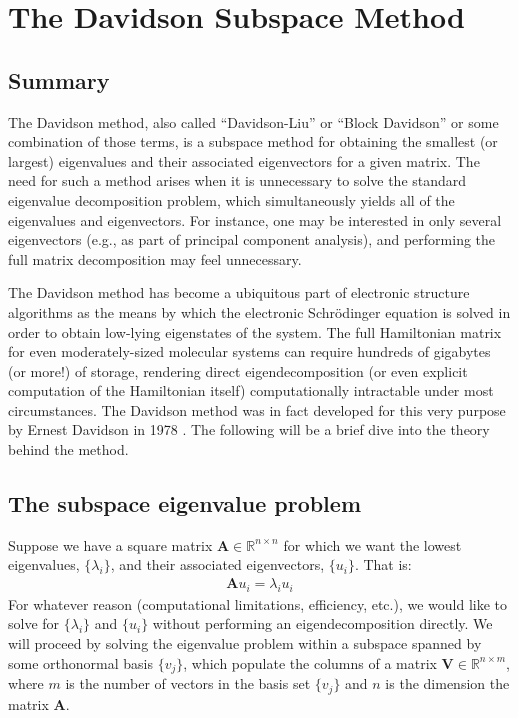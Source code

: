 \documentclass[12pt, fleqn]{article}
\begin{document}
\section*{The Davidson Subspace Method}
\subsection*{Summary}
\label{subsec:Summary}
The Davidson method, also called ``Davidson-Liu'' or ``Block Davidson'' or some combination of those terms, is a subspace method for obtaining the smallest (or largest) eigenvalues and their associated eigenvectors for a given matrix.
The need for such a method arises when it is unnecessary to solve the standard eigenvalue decomposition problem, which simultaneously yields all of the eigenvalues and eigenvectors. 
For instance, one may be interested in only several eigenvectors (e.g., as part of principal component analysis), and performing the full matrix decomposition may feel unnecessary. \newline

\noindent The Davidson method has become a ubiquitous part of electronic structure algorithms as the means by which the electronic Schr\"odinger equation is solved in order to obtain low-lying eigenstates of the system. 
The full Hamiltonian matrix for even moderately-sized molecular systems can require hundreds of gigabytes (or more!) of storage, rendering direct eigendecomposition (or even explicit computation of the Hamiltonian itself) computationally intractable under most circumstances.
The Davidson method was in fact developed for this very purpose by Ernest Davidson in 1978 \cite{Davidson1983}.
The following will be a brief dive into the theory behind the method. 

\subsection*{The subspace eigenvalue problem}
Suppose we have a square matrix $\mathbf{A} \in \mathbb{R}^{n \times n}$ for which we want the lowest eigenvalues, $\{\lambda_i\}$, and their associated eigenvectors, $\{u_i\}$. 
That is:
\begin{align}
    \mathbf{A} u_i = \lambda_i u_i 
\end{align}
For whatever reason (computational limitations, efficiency, etc.), we would like to solve for $\{\lambda_i\}$ and $\{u_i\}$ without performing an eigendecomposition directly. 
We will proceed by solving the eigenvalue problem within a subspace spanned by some orthonormal basis $\{v_j\}$, which populate the columns of a matrix $\mathbf{V} \in \mathbb{R}^{n \times m}$, where $m$ is the number of vectors in the basis set $\{v_j\}$ and $n$ is the dimension the matrix $\mathbf{A}$. \newline
\end{document}
